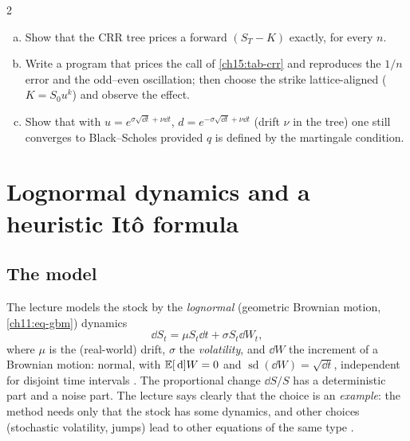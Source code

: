 \begin{paracol}{2}
\begin{exercise}\label{ch15:ex-tree}
\leavevmode
\begin{enumerate}[(a)]
  \item Show that the CRR tree prices a forward $(S_T-K)$ exactly, for every $n$.
  \item Write a program that prices the call of \cref{ch15:tab-crr} and reproduces the $1/n$ error and the odd--even oscillation; then choose the
      strike lattice-aligned ($K=S_0u^{k}$) and observe the effect.
  \item Show that with $u=e^{\sigma\sqrt{\dd t}+\nu\dd t}$, $d=e^{-\sigma\sqrt{\dd t}+\nu\dd t}$ (drift $\nu$ in the tree) one still converges to Black--Scholes provided $q$ is defined by the martingale condition.
\end{enumerate}
\end{exercise}

\section{Lognormal dynamics and a heuristic It\^o formula}\label{ch15:sec-lognormal}

\subsection{The model}
The lecture models the stock by the \emph{lognormal} (geometric Brownian motion, \cref{ch11:eq-gbm}) dynamics
\begin{equation}\label{ch15:eq-gbm}
  \dd S_t=\mu S_t\dd t+\sigma S_t\dd W_t,
\end{equation}
where $\mu$ is the (real-world) drift, $\sigma$ the \emph{volatility}, and $\dd W$ the increment of a Brownian motion: normal, with
$\mathbb{E}[\,\mathrm{d}] W=0$ and $\operatorname{sd}(\dd W)=\sqrt{\dd t}$, independent for disjoint time intervals . The proportional change $\dd S/S$
has a deterministic part and a noise part. The lecture says clearly that the choice is an \emph{example}: the method needs only that the stock
has some dynamics, and other choices (stochastic volatility, jumps) lead to other equations of the same type
.


\end{paracol}
